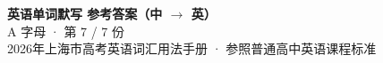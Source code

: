 \documentclass[10pt,a4paper]{article}
\begin{document}
\pagestyle{plain}

\begin{center}
{\LARGE\bfseries 英语单词默写 \quad 参考答案（中 $\to$ 英）}\\[0.22em]
{\large A 字母 · 第 7 / 7 份}\\[0.18em]
{\small 2026年上海市高考英语词汇用法手册 · 参照普通高中英语课程标准}
\end{center}

\vspace{0.2em}
\noindent{\color{rulegray}\rule{\textwidth}{0.8pt}}

\vspace{0.35em}

\vspace{0.25em}
\renewcommand{\arraystretch}{1.32}
\end{document}
